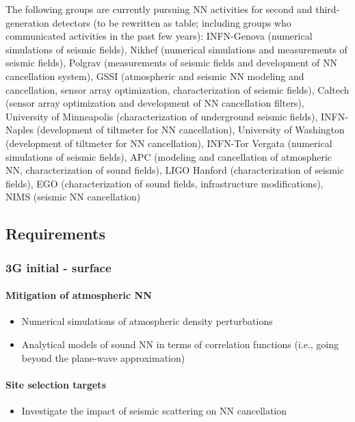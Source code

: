 The following groups are currently pursuing NN activities for second and third-generation detectors (to be rewritten as table; including groups who communicated activities in the past few years):
INFN-Genova (numerical simulations of seismic fields), 
Nikhef (numerical simulations and measurements of seismic fields), 
Polgrav (measurements of seismic fields and development of NN cancellation system), 
GSSI (atmospheric and seismic NN modeling and cancellation, sensor array optimization, characterization of seismic fields), 
Caltech (sensor array optimization and development of NN cancellation filters), 
University of Minneapolis (characterization of underground seismic fields), 
INFN-Naples (development of tiltmeter for NN cancellation), 
University of Washington (development of tiltmeter for NN cancellation), 
INFN-Tor Vergata (numerical simulations of seismic fields), 
APC (modeling and cancellation of atmospheric NN, characterization of sound fields),
LIGO Hanford (characterization of seismic fields), EGO (characterization of sound fields, infrastructure modifications), NIMS (seismic NN cancellation)

\subsection{Requirements}
\subsubsection{3G initial - surface}
\paragraph{Mitigation of atmospheric NN}
\begin{itemize}
\item Numerical simulations of atmospheric density perturbations
\item Analytical models of sound NN in terms of correlation functions (i.e., going beyond the plane-wave approximation)
\end{itemize}

\paragraph{Site selection targets}
\begin{itemize}
\item Investigate the impact of seismic scattering on NN cancellation
\end{itemize}


